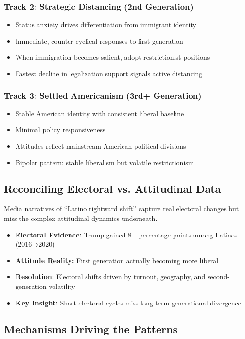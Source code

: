 \documentclass[11pt,letterpaper]{article}
\newcommand{\compactdesc}[2]{\item \textbf{#1:} #2}
\begin{document}
\subsubsection{Track 2: Strategic Distancing (2nd Generation)}
\begin{itemize}
    \item Status anxiety drives differentiation from immigrant identity
    \item Immediate, counter-cyclical responses to first generation
    \item When immigration becomes salient, adopt restrictionist positions
    \item Fastest decline in legalization support signals active distancing
\end{itemize}

\subsubsection{Track 3: Settled Americanism (3rd+ Generation)}
\begin{itemize}
    \item Stable American identity with consistent liberal baseline
    \item Minimal policy responsiveness
    \item Attitudes reflect mainstream American political divisions
    \item Bipolar pattern: stable liberalism but volatile restrictionism
\end{itemize}

\subsection{Reconciling Electoral vs. Attitudinal Data}

Media narratives of ``Latino rightward shift'' capture real electoral changes but miss the complex attitudinal dynamics underneath.

\begin{itemize}
    \compactdesc{Electoral Evidence}{Trump gained 8+ percentage points among Latinos (2016→2020)}
    \compactdesc{Attitude Reality}{First generation actually becoming more liberal}
    \compactdesc{Resolution}{Electoral shifts driven by turnout, geography, and second-generation volatility}
    \compactdesc{Key Insight}{Short electoral cycles miss long-term generational divergence}
\end{itemize}

\subsection{Mechanisms Driving the Patterns}
\end{document}
